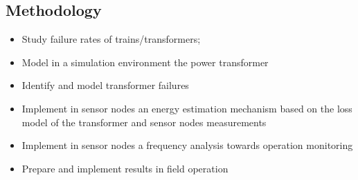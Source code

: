 \subsection{Methodology}

\begin{itemize}
	\setlength\itemsep{0em}
	\item Study failure rates of trains/transformers;
	
	\item Model in a simulation environment the power transformer

	\item Identify and model transformer failures

	\item Implement in sensor nodes an energy estimation mechanism based on the loss model of the transformer and sensor nodes measurements

	\item Implement in sensor nodes a frequency analysis towards operation monitoring

	\item Prepare and implement results in field operation
\end{itemize}
